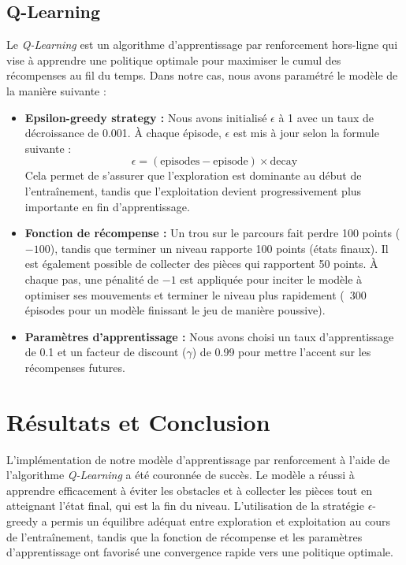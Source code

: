 \documentclass[a4paper,12pt]{article}
\begin{document}
\subsection{Q-Learning}
Le \textit{Q-Learning} est un algorithme d'apprentissage par renforcement hors-ligne qui vise à apprendre une politique optimale pour maximiser le cumul des récompenses au fil du temps. Dans notre cas, nous avons paramétré le modèle de la manière suivante :
\begin{itemize}
    \item \textbf{Epsilon-greedy strategy :} Nous avons initialisé $\epsilon$ à 1 avec un taux de décroissance de 0.001. À chaque épisode, $\epsilon$ est mis à jour selon la formule suivante : 
    \[
    \epsilon = (\text{episodes} - \text{episode}) \times \text{decay}
    \]
    Cela permet de s'assurer que l'exploration est dominante au début de l'entraînement, tandis que l'exploitation devient progressivement plus importante en fin d'apprentissage.
    \item \textbf{Fonction de récompense :} Un trou sur le parcours fait perdre 100 points ($-100$), tandis que terminer un niveau rapporte 100 points  (états finaux). Il est également possible de collecter des pièces qui rapportent 50 points. À chaque pas, une pénalité de $-1$ est appliquée pour inciter le modèle à optimiser ses mouvements et terminer le niveau plus rapidement (~300 épisodes pour un modèle finissant le jeu de manière poussive).
    \item \textbf{Paramètres d'apprentissage :} Nous avons choisi un taux d'apprentissage de 0.1 et un facteur de discount ($\gamma$) de 0.99 pour mettre l'accent sur les récompenses futures.
\end{itemize}

\section{Résultats et Conclusion}
L'implémentation de notre modèle d'apprentissage par renforcement à l'aide de l'algorithme \textit{Q-Learning} a été couronnée de succès. Le modèle a réussi à apprendre efficacement à éviter les obstacles et à collecter les pièces tout en atteignant l'état final, qui est la fin du niveau. L'utilisation de la stratégie $\epsilon$-greedy a permis un équilibre adéquat entre exploration et exploitation au cours de l'entraînement, tandis que la fonction de récompense et les paramètres d'apprentissage ont favorisé une convergence rapide vers une politique optimale.
\end{document}
